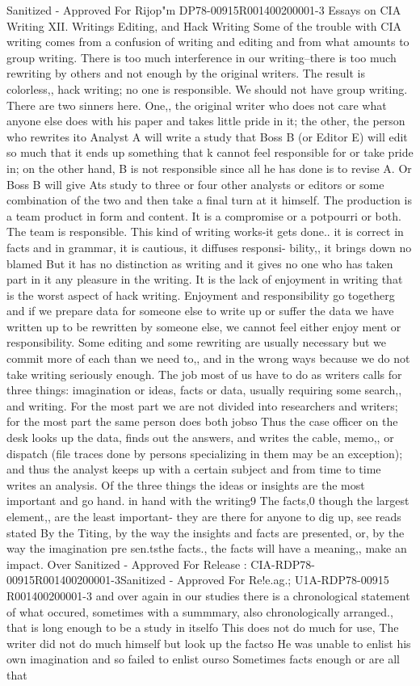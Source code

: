 \documentclass[
    oneside,
    11pt,
    draft
]{memoir}
\begin{document}
Sanitized - Approved For Rijop"m DP78-00915R001400200001-3 Essays on CIA Writing XII. Writings Editing, and Hack Writing Some of the trouble with CIA writing comes from a confusion of writing and editing and from what amounts to group writing. There is too much interference in our writing--there is too much rewriting by others and not enough by the original writers. The result is colorless,, hack writing; no one is responsible. We should not have group writing. There are two sinners here. One,, the original writer who does not care what anyone else does with his paper and takes little pride in it; the other, the person who rewrites ito Analyst A will write a study that Boss B (or Editor E) will edit so much that it ends up something that k cannot feel responsible for or take pride in; on the other hand, B is not responsible since all he has done is to revise A. Or Boss B will give Ats study to three or four other analysts or editors or some combination of the two and then take a final turn at it himself. The production is a team product in form and content. It is a compromise or a potpourri or both. The team is responsible. This kind of writing works-it gets done.. it is correct in facts and in grammar, it is cautious, it diffuses responsi- bility,, it brings down no blamed But it has no distinction as writing and it gives no one who has taken part in it any pleasure in the writing. It is the lack of enjoyment in writing that is the worst aspect of hack writing. Enjoyment and responsibility go togetherg and if we prepare data for someone else to write up or suffer the data we have written up to be rewritten by someone else, we cannot feel either enjoy ment or responsibility. Some editing and some rewriting are usually necessary but we commit more of each than we need to,, and in the wrong ways because we do not take writing seriously enough. The job most of us have to do as writers calls for three things: imagination or ideas, facts or data, usually requiring some search,, and writing. For the most part we are not divided into researchers and writers; for the most part the same person does both jobso Thus the case officer on the desk looks up the data, finds out the answers, and writes the cable, memo,, or dispatch (file traces done by persons specializing in them may be an exception); and thus the analyst keeps up with a certain subject and from time to time writes an analysis. Of the three things the ideas or insights are the most important and go hand. in hand with the writing9 The facts,0 though the largest element,, are the least important- they are there for anyone to dig up, see reads stated By the Titing, by the way the insights and facts are presented, or, by the way the imagination pre sen.tsthe facts., the facts will have a meaning,, make an impact. Over Sanitized - Approved For Release : CIA-RDP78-00915R001400200001-3Sanitized - Approved For Re!e.ag.; U1A-RDP78-00915 R001400200001-3 and over again in our studies there is a chronological statement of what occured, sometimes with a summmary, also chronologically arranged., that is long enough to be a study in itselfo This does not do much for use, The writer did not do much himself but look up the factso He was unable to enlist his own imagination and so failed to enlist ourso Sometimes facts enough or are all that 
\end{document}
